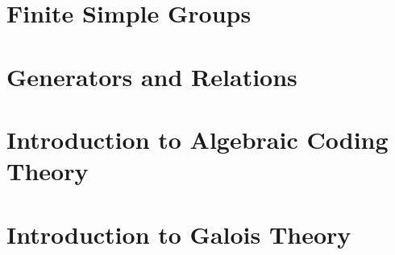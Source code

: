\documentclass[a4paper, 12pt]{report}
\begin{document}
	\chapter{Finite Simple Groups}
	
	
	\chapter{Generators and Relations}
	
	
	\chapter{Introduction to Algebraic Coding Theory}
	
	
	\chapter{Introduction to Galois Theory}
	
	
\end{document}
